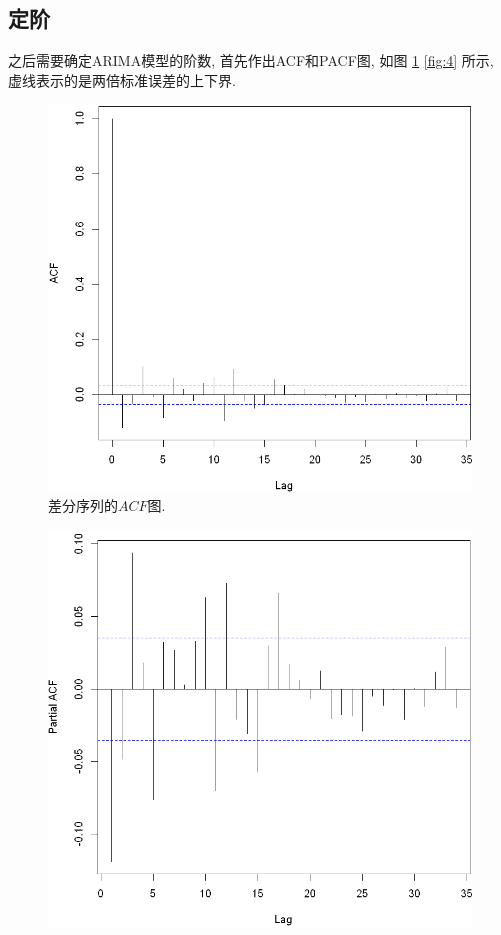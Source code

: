 \documentclass[12pt]{article}
\begin{document}
\subsection{定阶}
\qquad 之后需要确定ARIMA模型的阶数, 首先作出ACF和PACF图, 如图 \ref{fig:3} \ref{fig:4} 所示, 虚线表示的是两倍标准误差的上下界. 
\begin{center}
    \hspace{30pt}\begin{minipage}{0.45\textwidth}
        \begin{figure}
            \centering
            \hspace{-30pt}\includegraphics[width=.95\textwidth]{output_8_0}
            \caption{差分序列的$ACF$图.\label{fig:3}}
        \end{figure}
    \end{minipage}
    \begin{minipage}{0.45\textwidth}
        \begin{figure}
            \centering
            \hspace{-25pt}\includegraphics[width=.95\textwidth]{output_9_0}

\end{figure}
\end{minipage}
\end{center}
\end{document}

